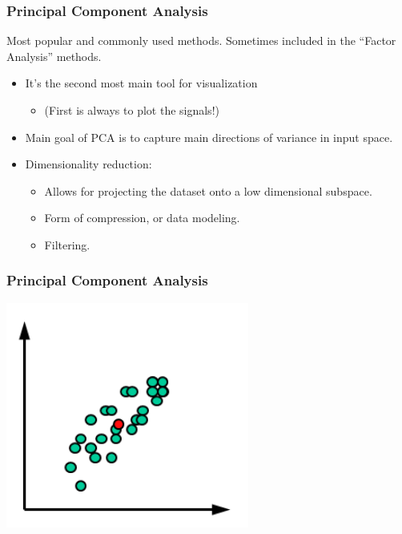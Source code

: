 \documentclass[10pt, colorlinks]{beamer}
\begin{document}
\begin{frame}
  \frametitle{Principal Component Analysis }
  \begin{block}{}
    Most popular and commonly used methods. Sometimes included in the
    ``Factor Analysis'' methods.
  \end{block}
  \begin{itemize}
  \item<+-> It's the second most main tool for visualization
    \begin{itemize}
    \item (First is always to plot the signals!)
    \end{itemize}
  \item<+-> Main goal of PCA is to capture main directions of variance
    in input space.
  \item<+-> Dimensionality reduction:
    \begin{itemize}
    \item<+-> Allows for projecting the dataset onto a low dimensional subspace.
    \item<+-> Form of compression, or data modeling.
    \item<+-> Filtering.
    \end{itemize}

  \end{itemize}
\end{frame}



\begin{frame}
    \frametitle{Principal Component Analysis }
    \begin{center}
        \centering \includegraphics[width=0.6\textwidth]{figs/center}
    \end{center}  

\end{frame}
\end{document}
